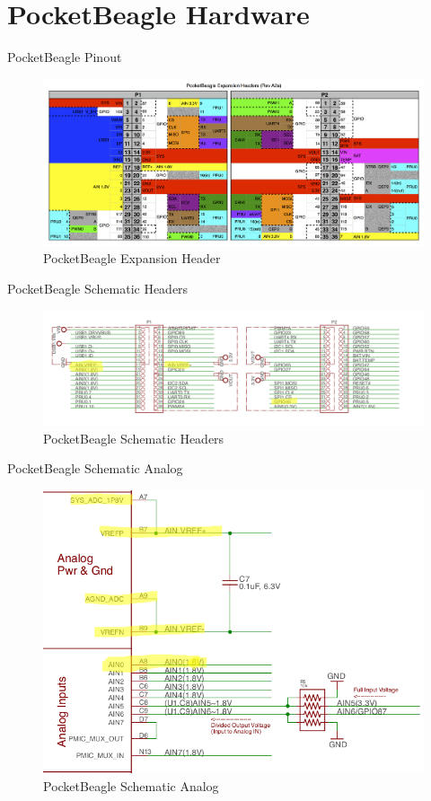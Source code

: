 \section{PocketBeagle Hardware}

\begin{frame}
   {PocketBeagle Pinout}
	     \begin{figure}[H]
		     \includegraphics[width=6in]{IMAGES/pb-pinout}
				       \caption{PocketBeagle Expansion Header}
	     \end{figure}
\end{frame}

\begin{frame}
	{PocketBeagle Schematic Headers}
	     \begin{figure}[H]
		     \includegraphics[width=6in]{IMAGES/pb-sch-headers-annotated}
				       \caption{PocketBeagle Schematic Headers}
	     \end{figure}
\end{frame}

\begin{frame}
	{PocketBeagle Schematic Analog}
	     \begin{figure}[H]
		     \includegraphics[width=4.5in]{IMAGES/pb-sch-analog-annotated}
				       \caption{PocketBeagle Schematic Analog}
	     \end{figure}
\end{frame}
